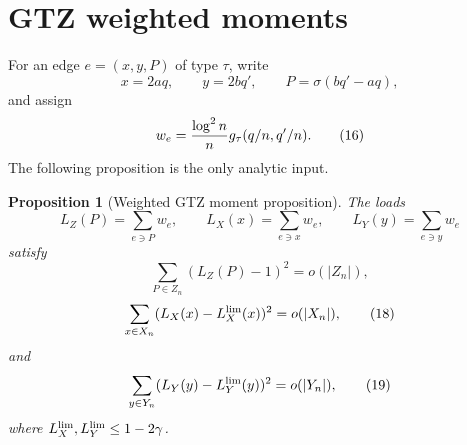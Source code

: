 \documentclass[11pt]{article}
\newtheorem{proposition}[theorem]{Proposition}
\begin{document}
\section{GTZ weighted moments}

For an edge $e=(x,y,P)$ of type $\tau$, write
\[
  x=2aq,
  \qquad y=2bq',
  \qquad P=\sigma(bq'-aq),
\]
and assign
\[
  w_e={\log^2 n\over n}g_\tau(q/n,q'/n).                    \tag{16}
\]
The following proposition is the only analytic input.

\begin{proposition}[Weighted GTZ moment proposition]\label{prop:gtz}
The loads
\[
  L_Z(P)=\sum_{e\ni P}w_e,
  \qquad
  L_X(x)=\sum_{e\ni x}w_e,
  \qquad
  L_Y(y)=\sum_{e\ni y}w_e
\]
satisfy
\[
  \sum_{P\in Z_n}(L_Z(P)-1)^2=o(|Z_n|),                    \tag{17}
\]
\[
  \sum_{x\in X_n}(L_X(x)-L_X^{\rm lim}(x))^2=o(|X_n|),      \tag{18}
\]
and
\[
  \sum_{y\in Y_n}(L_Y(y)-L_Y^{\rm lim}(y))^2=o(|Y_n|),      \tag{19}
\]
where $L_X^{\rm lim},L_Y^{\rm lim}\le1-2\gamma$.
\end{proposition}
\end{document}
